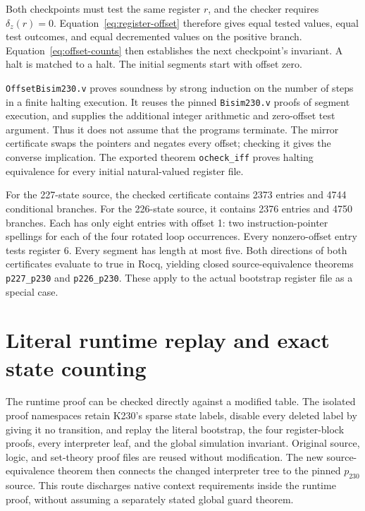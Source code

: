 Both checkpoints must test the same register \(r\), and the checker
requires \(\delta_z(r)=0\). Equation~\eqref{eq:register-offset} therefore
gives equal tested values, equal test outcomes, and equal decremented values
on the positive branch. Equation~\eqref{eq:offset-counts} then establishes
the next checkpoint's invariant. A halt is matched to a halt. The initial
segments start with offset zero.

\texttt{OffsetBisim230.v} proves soundness by strong induction on the
number of steps in a finite halting execution. It reuses the pinned
\texttt{Bisim230.v} proofs of segment execution, and supplies the additional
integer arithmetic and zero-offset test argument. Thus it does not assume
that the programs terminate. The mirror certificate swaps the pointers
and negates every offset; checking it gives the converse implication.
The exported theorem \texttt{ocheck\_iff} proves halting equivalence for
every initial natural-valued register file.

For the 227-state source, the checked certificate contains 2373 entries
and 4744 conditional branches. For the 226-state source, it contains
2376 entries and 4750 branches. Each has only eight entries with offset 1:
two instruction-pointer spellings for each of the four rotated loop
occurrences. Every nonzero-offset entry tests register 6. Every segment
has length at most five. Both directions of both certificates evaluate
to true in Rocq, yielding closed source-equivalence theorems
\texttt{p227\_p230} and \texttt{p226\_p230}. These apply to the actual
bootstrap register file as a special case.

\section{Literal runtime replay and exact state counting}
\label{sec:literal-runtime-replay}

The runtime proof can be checked directly against a modified table. The
isolated proof namespaces retain K230's sparse state labels, disable every
deleted label by giving it no transition, and replay the literal bootstrap,
the four register-block proofs, every interpreter leaf, and the global
simulation invariant. Original source, logic, and set-theory proof files
are reused without modification. The new source-equivalence theorem then
connects the changed interpreter tree to the pinned \(p_{230}\) source.
This route discharges native context requirements inside the runtime proof,
without assuming a separately stated global guard theorem.

